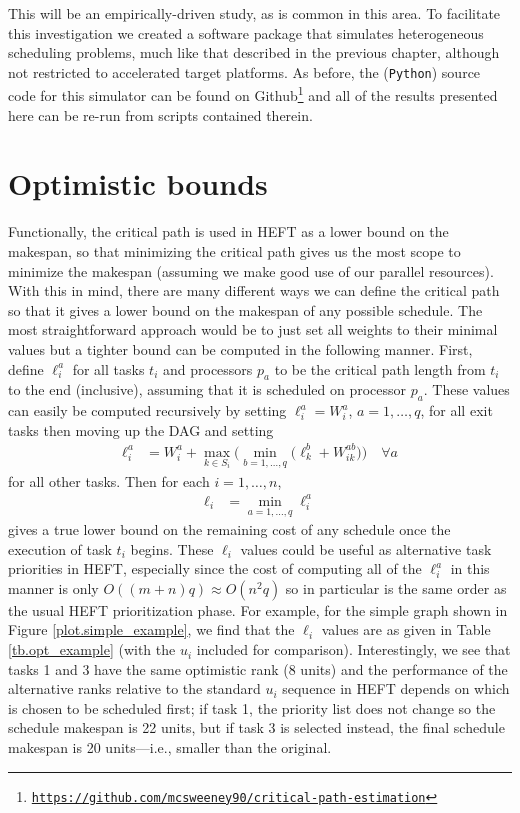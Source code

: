 \documentclass[12pt]{article}
\begin{document}
This will be an empirically-driven study, as is common in this area. To facilitate this investigation we created a software package that simulates heterogeneous scheduling problems, much like that described in the previous chapter, although not restricted to accelerated target platforms. As before, the ({\tt Python}) source code for this simulator can be found on Github\footnote{\href{https://github.com/mcsweeney90/critical-path-estimation}{{\tt \small https://github.com/mcsweeney90/critical-path-estimation}}} and all of the results presented here can be re-run from scripts contained therein. 


\section{Optimistic bounds}
\label{sect.optimistic}

Functionally, the critical path is used in HEFT as a lower bound on the makespan, so that minimizing the critical path gives us the most scope to minimize the makespan (assuming we make good use of our parallel resources). With this in mind, there are many different ways we can define the critical path so that it gives a lower bound on the makespan of any possible schedule. The most straightforward approach would be to just set all weights to their minimal values but a tighter bound can be computed in the following manner. First, define $\ell_i^a$ for all tasks $t_i$ and processors $p_a$ to be the critical path length from $t_i$ to the end (inclusive), assuming that it is scheduled on processor $p_a$. These values can easily be computed recursively by setting $\ell_i^a = W_i^a$, $a = 1, \dots, q$, for all exit tasks then moving up the DAG and setting 
\begin{align}
\ell_i^a &= W_i^a + \max_{k \in S_i} \bigg( \min_{b = 1, \dots, q} \big( \ell_k^b + W_{ik}^{ab} \big)  \bigg) \quad \forall a \label{eq.opt_uia} 
\end{align}
for all other tasks. Then for each $i = 1, \dots, n$,
\begin{align}
\ell_i &= \min_{a = 1, \dots, q}\ell_i^a \label{eq.opt_ui} 
\end{align}
gives a true lower bound on the remaining cost of any schedule once the execution of task $t_i$ begins. These $\ell_i$ values could be useful as alternative task priorities in HEFT, especially since the cost of computing all of the $\ell_i^a$ in this manner is only $O((m + n)q) \approx O(n^2q)$ so in particular is the same order as the usual HEFT prioritization phase. For example, for the simple graph shown in Figure \ref{plot.simple_example}, we find that the $\ell_i$ values are as given in Table \ref{tb.opt_example} (with the $u_i$ included for comparison). Interestingly, we see that tasks 1 and 3 have the same optimistic rank (8 units) and the performance of the alternative ranks relative to the standard $u_i$ sequence in HEFT depends on which is chosen to be scheduled first; if task 1, the priority list does not change so the schedule makespan is 22 units, but if task 3 is selected instead, the final schedule makespan is 20 units---i.e., smaller than the original.
\end{document}
